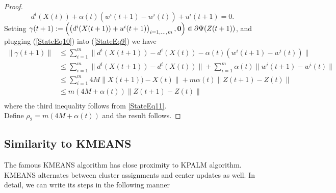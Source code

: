 \documentclass[11pt]{article}
\numberwithin{equation}{section}
\begin{document}
\begin{proof}
\begin{equation}
	d^i(X(t)) + \alpha(t) \left( w^i(t+1) - w^i(t) \right) + u^i(t+1) = 0 . \label{StateEq10}
\end{equation}
Setting $\gamma(t+1) := \left( \left( d^i(X(t+1)) + u^i(t+1) \right)_{i=1, \ldots ,m}, \bf{0} \right) \in \partial \Psi(Z(t+1))$, and plugging (\ref{StateEq10}) into (\ref{StateEq9}) we have
\begin{equation*}
\begin{aligned}
	\| \gamma(t+1) \|
	& \leq \sum\limits_{i=1}^{m} \| d^i(X(t+1)) - d^i(X(t)) - \alpha(t) \left( w^i(t+1) - w^i(t) \right) \| \\
	& \leq \sum\limits_{i=1}^{m} \| d^i(X(t+1)) - d^i(X(t)) \| + \sum\limits_{i=1}^{m} \alpha(t) \| w^i(t+1) - w^i(t) \| \\
	& \leq \sum\limits_{i=1}^{m} 4M \| X(t+1)) - X(t) \| + m \alpha(t) \|Z(t+1) - Z(t)\| \\
	& \leq m \left( 4M + \alpha(t) \right) \|Z(t+1) - Z(t)\| \\
\end{aligned}
\end{equation*}
where the third inequality follows from \cref{StateEq11}. \\
Define $\rho_2 = m \left( 4M + \alpha(t) \right)$ and the result follows.
\end{proof}


\subsection{Similarity to KMEANS}
The famous KMEANS algorithm has close proximity to KPALM algorithm. KMEANS alternates between cluster assignments and center updates as well. In detail, we can write its steps in the following manner
\end{document}
